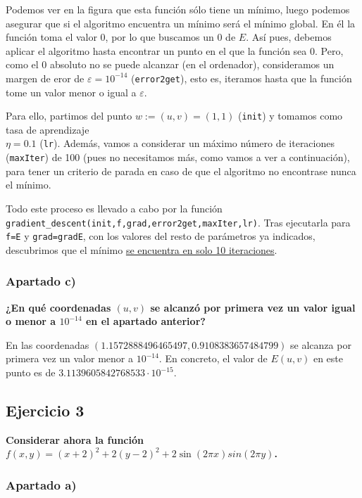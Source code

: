 \documentclass[a4]{article}
\begin{document}
Podemos ver en la figura que esta función sólo tiene un mínimo, luego podemos asegurar que si el algoritmo encuentra un mínimo será el mínimo global. En él la función toma el valor 0, por lo que buscamos un 0 de $E$. Así pues, debemos aplicar el algoritmo hasta encontrar un punto en el que la función sea 0. Pero, como el 0 absoluto no se puede alcanzar (en el ordenador), consideramos un margen de eror de $\varepsilon=10^{-14}$ (\lstinline|error2get|), esto es, iteramos hasta que la función tome un valor menor o igual a $\varepsilon$.

Para ello, partimos del punto $w:=(u,v)=(1,1)$ (\lstinline|init|) y tomamos como tasa de aprendizaje \\ $\eta=0.1$ (\lstinline|lr|). Además, vamos a considerar un máximo número de iteraciones (\lstinline|maxIter|) de 100 (pues no necesitamos más, como vamos a ver a continuación), para tener un criterio de parada en caso de que el algoritmo no encontrase nunca el mínimo. 

Todo este proceso es llevado a cabo por la función \lstinline|gradient_descent(init,f,grad,error2get,maxIter,lr)|.
Tras ejecutarla para \lstinline|f=E| y \lstinline|grad=gradE|, con los valores del resto de parámetros ya indicados, descubrimos que el mínimo \underline{se encuentra en solo 10 iteraciones}. 

\subsubsection{Apartado c)}

\textbf{¿En qué coordenadas $(u,v)$ se alcanzó por primera vez un valor igual o menor a $10^{-14}$
en el apartado anterior?}

En las coordenadas $( 1.1572888496465497 ,  0.9108383657484799 )$ se alcanza por primera vez un valor menor a $10^{-14}$. En concreto, el valor de $E(u,v)$ en este punto es de $3.1139605842768533\cdot10^{-15}$.

\subsection{Ejercicio 3}

\textbf{Considerar ahora la función $f(x,y)=(x+2)^2 +2(y-2)^2 +2\sin(2\pi x)sin(2\pi y)$.}

\subsubsection{Apartado a)}
\end{document}
